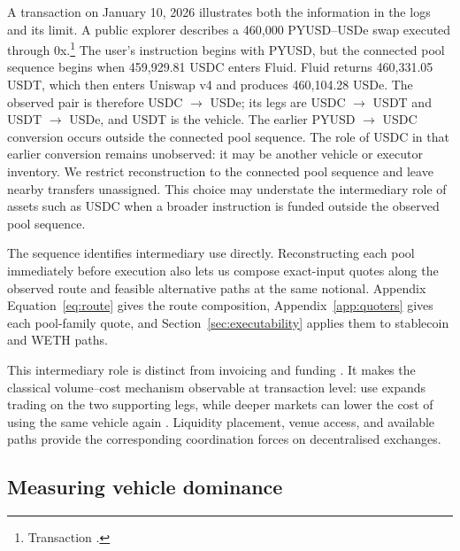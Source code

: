 A transaction on January 10, 2026 illustrates both the information in the logs and its limit. A public explorer describes a 460,000 PYUSD--USDe swap executed through 0x.\footnote{Transaction .} The user's instruction begins with PYUSD, but the connected pool sequence begins when 459,929.81 USDC enters Fluid. Fluid returns 460,331.05 USDT, which then enters Uniswap v4 and produces 460,104.28 USDe. The observed pair is therefore USDC $\rightarrow$ USDe; its legs are USDC $\rightarrow$ USDT and USDT $\rightarrow$ USDe, and USDT is the vehicle. The earlier PYUSD $\rightarrow$ USDC conversion occurs outside the connected pool sequence. The role of USDC in that earlier conversion remains unobserved: it may be another vehicle or executor inventory. We restrict reconstruction to the connected pool sequence and leave nearby transfers unassigned. This choice may understate the intermediary role of assets such as USDC when a broader instruction is funded outside the observed pool sequence.

The sequence identifies intermediary use directly. Reconstructing each pool immediately before execution also lets us compose exact-input quotes along the observed route and feasible alternative paths at the same notional. Appendix Equation~\eqref{eq:route} gives the route composition, Appendix~\ref{app:quoters} gives each pool-family quote, and Section~\ref{sec:executability} applies them to stablecoin and WETH paths.

This intermediary role is distinct from invoicing and funding \citep{GopinathEtAl2020DCP,GopinathStein2021Making,Mukhin2022InternationalPriceSystem}. It makes the classical volume--cost mechanism observable at transaction level: use expands trading on the two supporting legs, while deeper markets can lower the cost of using the same vehicle again \citep{Krugman1980VehicleCurrencies,KiyotakiWright1989MoneyMedium,DowdGreenaway1993CurrencyCompetition}. Liquidity placement, venue access, and available paths provide the corresponding coordination forces on decentralised exchanges.

\subsection{Measuring vehicle dominance}
\label{sec:setting:definitions}

